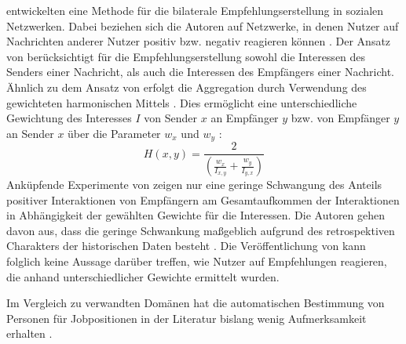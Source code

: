 \textcite[S. 247ff.]{kim:2:inproceedings} entwickelten eine Methode für die bilaterale Empfehlungserstellung in sozialen Netzwerken.
Dabei beziehen sich die Autoren auf Netzwerke, in denen Nutzer auf Nachrichten anderer Nutzer positiv bzw. negativ reagieren können \cite[S. 548]{koprinska:inbook} .
Der Ansatz von \textcite[S. 247ff.]{kim:2:inproceedings} berücksichtigt für die Empfehlungserstellung sowohl die Interessen des Senders einer Nachricht, als auch die Interessen des Empfängers einer Nachricht.
Ähnlich zu dem Ansatz von \textcite[S. 207ff.]{pizzato:2010} erfolgt die Aggregation durch Verwendung des gewichteten harmonischen Mittels \cite[S. 251]{kim:2:inproceedings}.
Dies ermöglicht eine unterschiedliche Gewichtung des Interesses $I$ von Sender $x$ an Empfänger $y$ bzw. von Empfänger $y$ an Sender $x$ über die Parameter $w_{x}$ und $w_{y}$ \cite[S. 251]{kim:2:inproceedings}:
\begin{equation}\label{eq34}
    H(x,y) = \frac{2}{(\frac{w_{x}}{I_{x,y}}+\frac{w_{y}}{I_{y,x}})}
\end{equation}
Anküpfende Experimente von \textcite[S. 259]{kim:2:inproceedings} zeigen nur eine geringe Schwangung des Anteils positiver Interaktionen von Empfängern am Gesamtaufkommen der Interaktionen in Abhängigkeit der gewählten Gewichte für die Interessen.
Die Autoren gehen davon aus, dass die geringe Schwankung maßgeblich aufgrund des retrospektiven Charakters der historischen Daten besteht \cite[S. 259]{kim:2:inproceedings}.
Die Veröffentlichung von \textcite[S. 259]{kim:2:inproceedings} kann folglich keine Aussage darüber treffen, wie Nutzer auf Empfehlungen reagieren, die anhand unterschiedlicher Gewichte ermittelt wurden.

Im Vergleich zu verwandten Domänen hat die automatischen Bestimmung von Personen für Jobpositionen in der Literatur bislang wenig Aufmerksamkeit erhalten \cite[S. 1469]{yildirim:article}.

